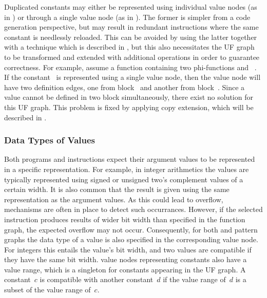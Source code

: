 Duplicated constants may either be represented using individual \glspl{value
  node} (as in ) or through a single
\gls{value node} (as in ).
%
The former is simpler from a \gls{code generation} perspective, but may result
in redundant \glspl{instruction} where the same constant is needlessly reloaded.
%
This can be avoided by using the latter together with a technique which is
described in , but this also necessitates the
\gls{UF graph} to be transformed and extended with additional \glspl{operation}
in order to guarantee correctness.
%
For example, assume a \gls{function} containing two \glspl{phi-function}
\mbox{\irFont {}} and \mbox{\irFont
  }.
%
If the constant~ is represented using a single \gls{value node}, then
the \gls{value node} will have two \glspl{definition edge}, one from
\gls{block}~ and another from \gls{block}~.
%
Since a value cannot be defined in two \gls{block} simultaneously, there exist
no \gls{solution} for this \gls{UF graph}.
%
This problem is fixed by applying \gls{copy extension}, which will be described
in .


\subsubsection{Data Types of Values}

Both \glspl{program} and \glspl{instruction} expect their argument values to be
represented in a specific representation.
%
For example, in integer arithmetics the values are typically represented using
signed or unsigned two's complement values of a certain width.
%
It is also common that the result is given using the same representation as the
argument values.
%
As this could lead to overflow, mechanisms are often in place to detect such
occurrances.
%
However, if the selected \gls{instruction} produces results of wider bit width
than specified in the \gls{function graph}, the expected overflow may not occur.
%
Consequently, for both  and \glspl{pattern graph} the
data type of a value is also specified in the corresponding \gls{value node}.
%
For integers this entails the value's bit width, and two values are compatible
if they have the same bit width.
%
\Glspl{value node} representing constants also have a value range, which is a
singleton for constants appearing in the \gls{UF graph}.
%
A constant~$c$ is compatible with another constant~$d$ if the value range of~$d$
is a subset of the value range of~$c$.


